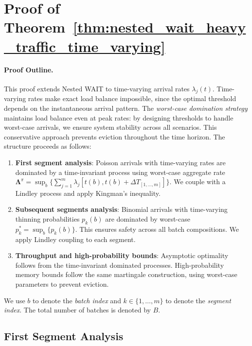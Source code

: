 
\section{Proof of Theorem~\ref{thm:nested_wait_heavy_traffic_time_varying}}\label{appendix:: proof of nested optimality, time varying.}

\paragraph{Proof Outline.}
This proof extends Nested WAIT to time-varying arrival rates $\lambda_j(t)$. Time-varying rates make exact load balance impossible, since the optimal threshold depends on the instantaneous arrival pattern. The \emph{worst-case domination strategy} maintains load balance even at peak rates: by designing thresholds to handle worst-case arrivals, we ensure system stability across all scenarios. This conservative approach prevents eviction throughout the time horizon. The structure proceeds as follows:
\begin{enumerate}
    \item \textbf{First segment analysis}: Poisson arrivals with time-varying rates are dominated by a time-invariant process using worst-case aggregate rate $\mathbf{\Lambda}^{\pi} = \sup_b \{\sum_{j=1}^m \lambda_j[t(b), t(b)+\Delta T_{[1,\ldots,m]}]\}$. We couple with a Lindley process and apply Kingman's inequality.
    \item \textbf{Subsequent segments analysis}: Binomial arrivals with time-varying thinning probabilities $p_k(b)$ are dominated by worst-case $p_k^* = \sup_b \{p_k(b)\}$. This ensures safety across all batch compositions. We apply Lindley coupling to each segment.
    \item \textbf{Throughput and high-probability bounds}: Asymptotic optimality follows from the time-invariant dominated processes. High-probability memory bounds follow the same martingale construction, using worst-case parameters to prevent eviction.
\end{enumerate}

We use $b$ to denote the \emph{batch index} and $k \in \{1, \ldots, m\}$ to denote the \emph{segment index}. The total number of batches is denoted by $B$.

\subsection{First Segment Analysis}

